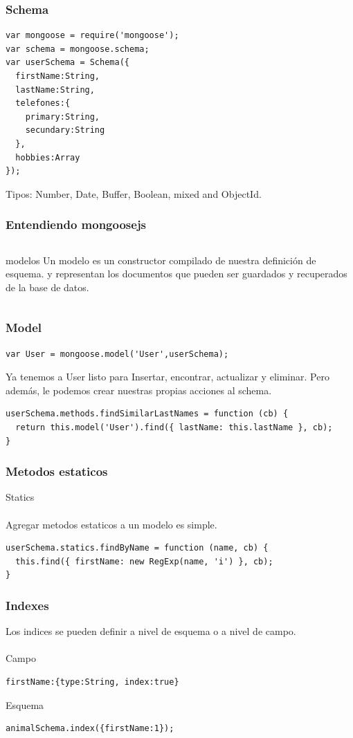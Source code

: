 \documentclass{beamer}
\begin{document}
\begin{frame}[fragile]
\frametitle{Schema}
\medskip
\begin{lstlisting}
var mongoose = require('mongoose');
var schema = mongoose.schema;
var userSchema = Schema({
  firstName:String,
  lastName:String,
  telefones:{
    primary:String,
    secundary:String
  },
  hobbies:Array
});

\end{lstlisting}
Tipos: Number, Date, Buffer, Boolean, mixed and ObjectId.
\end{frame}

\begin{frame}
\frametitle{Entendiendo mongoosejs}
\begin{columns}[c]
modelos
Un modelo es un constructor compilado de nuestra definici\'on de esquema.
y representan los documentos que pueden ser guardados y recuperados de la base de datos.
\end{columns}
\end{frame}

\begin{frame}[fragile]
\frametitle{Model}
\medskip
\begin{lstlisting}
var User = mongoose.model('User',userSchema);
\end{lstlisting}
Ya tenemos a User listo para Insertar, encontrar, actualizar y eliminar.
Pero adem\'as, le podemos crear nuestras propias acciones al schema.

\begin{lstlisting}
userSchema.methods.findSimilarLastNames = function (cb) {
  return this.model('User').find({ lastName: this.lastName }, cb);
}
\end{lstlisting}
\end{frame}

\begin{frame}[fragile]
\frametitle{Metodos estaticos}
Statics
\\~\\
Agregar metodos estaticos a un modelo es simple.
\medskip
\begin{lstlisting}
userSchema.statics.findByName = function (name, cb) {
  this.find({ firstName: new RegExp(name, 'i') }, cb);
}
\end{lstlisting}
\end{frame}

\begin{frame}[fragile]
\frametitle{Indexes}
Los indices se pueden definir a nivel de esquema o a nivel de campo.
\\~\\
Campo
\begin{lstlisting}
firstName:{type:String, index:true}
\end{lstlisting}
Esquema
\begin{lstlisting}
animalSchema.index({firstName:1});
\end{lstlisting}
\end{frame}
\end{document}
